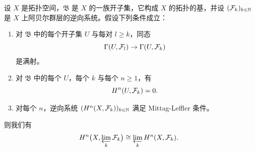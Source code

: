 \begin{lemma}\label{it:2.7.3}
设 $X$ 是拓扑空间，$\mathfrak{B}$ 是 $X$ 的一族开子集，它构成 $X$ 的拓扑的基，并设 $(\mathcal{F}_k)_{k\in\mathbb{N}}$ 是 $X$ 上阿贝尔群层的逆向系统。假设下列条件成立：
\begin{enumerate}[label=(\alph*),leftmargin=2.8em]
\item 对 $\mathfrak{B}$ 中的每个开子集 $U$ 与每对 $l\ge k$，同态
\begin{equation*}
\Gamma(U,\mathcal{F}_l)\to\Gamma(U,\mathcal{F}_k)
\end{equation*}
是满射。
\item 对 $\mathfrak{B}$ 中的每个 $U$，每个 $k$ 与每个 $n\ge1$，有
\begin{equation*}
H^n(U,\mathcal{F}_k)=0.
\end{equation*}
\item 对每个 $n$，逆向系统 $(H^n(X,\mathcal{F}_k))_{k\in\mathbb{N}}$ 满足 Mittag-Leffler 条件。
\end{enumerate}
则我们有
\begin{equation*}
H^n\big(X,\varprojlim_k\mathcal{F}_k\big)\cong\varprojlim_k H^n(X,\mathcal{F}_k).
\end{equation*}
\end{lemma}

